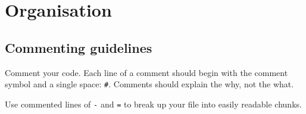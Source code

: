 \begin{Shaded}
\begin{Highlighting}[]
\StringTok{ }
\StringTok{ }
\end{Highlighting}
\end{Shaded}

\section{Organisation}

\subsection{Commenting guidelines}

Comment your code. Each line of a comment should begin with the comment
symbol and a single space: \texttt{\#}. Comments should explain the why,
not the what. 

Use commented lines of \texttt{-} and \texttt{=} to break up your file
into easily readable chunks.

\begin{Shaded}
\begin{Highlighting}[]

\end{Highlighting}
\end{Shaded}


